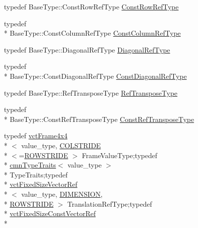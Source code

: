 \begin{DoxyCompactItemize}
\item 
typedef Base\-Type\-::\-Const\-Row\-Ref\-Type \hyperlink{classvct_frame4x4_const_base_af18cadccba2812e0d3cad82f43583ab0}{Const\-Row\-Ref\-Type}
\item 
typedef \\*
Base\-Type\-::\-Const\-Column\-Ref\-Type \hyperlink{classvct_frame4x4_const_base_a12760de72da52fc0917ad17373d369f3}{Const\-Column\-Ref\-Type}
\item 
typedef Base\-Type\-::\-Diagonal\-Ref\-Type \hyperlink{classvct_frame4x4_const_base_a6712c128a1d2b45ab9c713befeddf2c6}{Diagonal\-Ref\-Type}
\item 
typedef \\*
Base\-Type\-::\-Const\-Diagonal\-Ref\-Type \hyperlink{classvct_frame4x4_const_base_a83c846e0b484264c6d71c101b67d164a}{Const\-Diagonal\-Ref\-Type}
\item 
typedef Base\-Type\-::\-Ref\-Transpose\-Type \hyperlink{classvct_frame4x4_const_base_a1cedffcdbf60e8ec01a0a61d6ceb24b7}{Ref\-Transpose\-Type}
\item 
typedef \\*
Base\-Type\-::\-Const\-Ref\-Transpose\-Type \hyperlink{classvct_frame4x4_const_base_acac151b2d8a361ed229d8cdacac2b01f}{Const\-Ref\-Transpose\-Type}
\item 
typedef \hyperlink{classvct_frame4x4}{vct\-Frame4x4}\\*
$<$ value\-\_\-type, \hyperlink{classvct_frame4x4_const_base_a42bd2679548bfbb62bdca7f3a84c11fdac3f81140627afba5e58cb14bd1a4e648}{C\-O\-L\-S\-T\-R\-I\-D\-E}\\*
$<$=\hyperlink{classvct_frame4x4_const_base_a42bd2679548bfbb62bdca7f3a84c11fda381a64d4c14fac22ed91dcce4141d39d}{R\-O\-W\-S\-T\-R\-I\-D\-E} $>$ Frame\-Value\-Type;typedef \\*
\hyperlink{classcmn_type_traits}{cmn\-Type\-Traits}$<$ value\-\_\-type $>$\\*
 Type\-Traits;typedef \\*
\hyperlink{classvct_fixed_size_vector_ref}{vct\-Fixed\-Size\-Vector\-Ref}\\*
$<$ value\-\_\-type, \hyperlink{classvct_frame4x4_const_base_aa9000d4539e9ab27b091692d4bd0d986a97d7212e6c46dc9acbbd11bbc573d9a0}{D\-I\-M\-E\-N\-S\-I\-O\-N}, \\*
\hyperlink{classvct_frame4x4_const_base_a42bd2679548bfbb62bdca7f3a84c11fda381a64d4c14fac22ed91dcce4141d39d}{R\-O\-W\-S\-T\-R\-I\-D\-E} $>$ Translation\-Ref\-Type;typedef \\*
\hyperlink{classvct_fixed_size_const_vector_ref}{vct\-Fixed\-Size\-Const\-Vector\-Ref}\\*

\end{DoxyCompactItemize}
